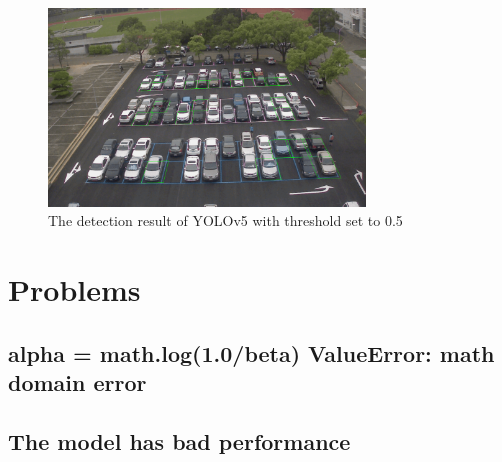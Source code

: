 \documentclass{article}[12pt]
\begin{document}
\begin{figure}[H]
    \centering
    \includegraphics[width=0.75\textwidth]{figure/Yolov5_first_frame_5.png}
    \caption{The detection result of YOLOv5 with threshold set to 0.5}
\end{figure}



\section{Problems}
\subsection{alpha = math.log(1.0/beta) ValueError: math domain error}
\subsection{The model has bad performance}
\end{document}
